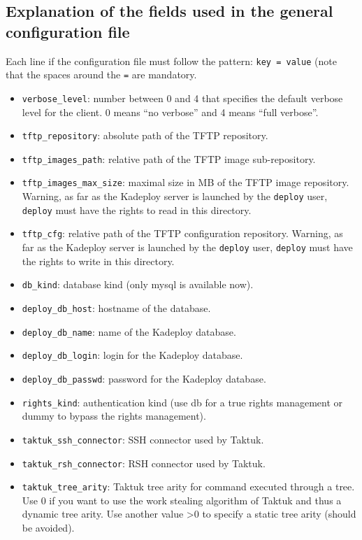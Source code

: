 \documentclass[a4wide,10pt,oneside]{book}
\begin{document}
\subsection{Explanation of the fields used in the general configuration file}
Each line if the configuration file must follow the pattern: \texttt{key = value} (note that the spaces around the \texttt{=} are mandatory.
\begin{itemize}
\item \texttt{verbose\_level}: number between 0 and 4 that specifies the default verbose level for the client. 0 means ``no verbose'' and 4 means ``full verbose''.
\item \texttt{tftp\_repository}: absolute path of the TFTP repository.
\item \texttt{tftp\_images\_path}: relative path of the TFTP image sub-repository.
\item \texttt{tftp\_images\_max\_size}: maximal size in MB of the TFTP image repository. Warning, as far as the Kadeploy server is launched by the \texttt{deploy} user, \texttt{deploy} must have the rights to read in this directory.
\item \texttt{tftp\_cfg}: relative path of the TFTP configuration repository. Warning, as far as the Kadeploy server is launched by the \texttt{deploy} user, \texttt{deploy} must have the rights to write in this directory.
\item \texttt{db\_kind}: database kind (only mysql is available now).
\item \texttt{deploy\_db\_host}: hostname of the database.
\item \texttt{deploy\_db\_name}: name of the Kadeploy database.
\item \texttt{deploy\_db\_login}: login for the Kadeploy database.
\item \texttt{deploy\_db\_passwd}: password for the Kadeploy database.
\item \texttt{rights\_kind}: authentication kind (use db for a true rights management or dummy to bypass the rights management).
\item \texttt{taktuk\_ssh\_connector}: SSH connector used by Taktuk.
\item \texttt{taktuk\_rsh\_connector}: RSH connector used by Taktuk.
\item \texttt{taktuk\_tree\_arity}: Taktuk tree arity for command executed through a tree. Use 0 if you want to use the work stealing algorithm of Taktuk and thus a dynamic tree arity. Use another value >0 to specify a static tree arity (should be avoided).

\end{itemize}
\end{document}
